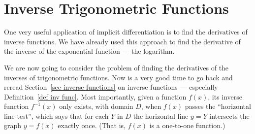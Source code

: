 \section{Inverse Trigonometric Functions}\label{sec:invTrig}
One very useful application of implicit differentiation is to find the
derivatives of inverse functions. We have already used this approach to find
the derivative of the inverse of the exponential function --- the
logarithm.

We are now going to consider the problem of finding the derivatives of the
inverses of trigonometric functions. Now is a very good time to go back
and reread Section~\ref{sec inverse functions} on inverse functions ---
especially Definition~\ref{def inv func}. Most importantly, given a function $f(x)$, its
inverse function $f^{-1}(x)$ only exists, with domain $D$, when $f(x)$ passes the
``horizontal line test'', which says that for each $Y$ in $D$ the horizontal line $y=Y$
intersects the graph $y=f(x)$ exactly once. (That is, $f(x)$  is a one-to-one function.)

